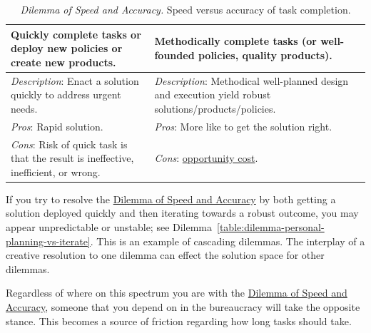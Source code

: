 
\begin{center}
\begin{table}[H] %
\begin{tabular}{ | m{\dilemmatablewidth}| m{\dilemmatablewidth} | } 
  \hline
  \textbf{Quickly complete tasks or deploy new policies or create new products.} & 
  \textbf{Methodically complete tasks (or well-founded policies, quality products).} \\ 
  \hline
  \textit{Description}: Enact a solution quickly to address urgent needs. &
  \textit{Description}: Methodical well-planned design and execution yield robust solutions/products/policies. \\
  \hline
  \textit{Pros}: Rapid solution. &
  \textit{Pros}: More like to get the solution right. \\
  \hline
  \textit{Cons}: Risk of quick task is that the result is ineffective, inefficient, or wrong. &
  \textit{Cons}: \href{https://en.wikipedia.org/wiki/Opportunity_cost}{opportunity cost}. 
  \index{Wikipedia!\href{https://en.wikipedia.org/wiki/Opportunity_cost}{opportunity cost}}
  \\  
  \hline
\end{tabular}
\caption{
\textit{Dilemma of Speed and Accuracy.}
Speed versus accuracy of task completion.
}
\label{table:dilemma-personal-quick-methodical}
\end{table}
\end{center}

If you try to resolve the \hyperref[table:dilemma-personal-quick-methodical]{Dilemma of Speed and Accuracy} by both getting a solution deployed quickly and then iterating towards a robust outcome, you may appear unpredictable or unstable; see Dilemma~\ref{table:dilemma-personal-planning-vs-iterate}. This is an example of cascading dilemmas. The interplay of a creative resolution to one dilemma can effect the solution space for other dilemmas. 

Regardless of where on this spectrum you are with the \hyperref[table:dilemma-personal-quick-methodical]{Dilemma of Speed and Accuracy}, someone that you depend on in the bureaucracy will take the opposite stance. This becomes a source of friction regarding how long tasks should take. 

